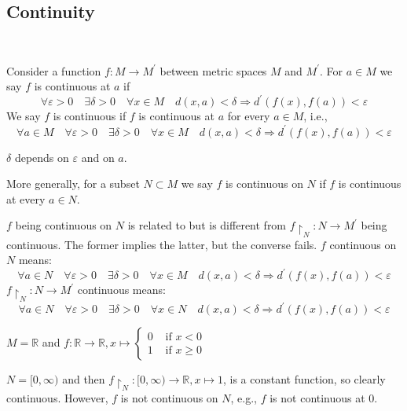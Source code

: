 \documentclass[a4paper,11pt]{article}
\begin{document}
\subsection{Continuity}\ \vspace{-1.5em}
\begin{definition}
    Consider a function $f: M \rightarrow M^{\prime}$ between metric spaces $M$ and $M^{\prime}$. For $a \in M$ we say $f$ is continuous at $a$ if
    \[
    \forall \varepsilon>0 \quad \exists \delta>0 \quad \forall x \in M \quad d(x, a)<\delta \Longrightarrow d^{\prime}(f(x), f(a))<\varepsilon
    \]
    We say $f$ is continuous if $f$ is continuous at $a$ for every $a \in M$, i.e.,
    \[
    \forall a \in M \quad \forall \varepsilon>0 \quad \exists \delta>0 \quad \forall x \in M \quad d(x, a)<\delta \Longrightarrow d^{\prime}(f(x), f(a))<\varepsilon
    \]
\end{definition}
\begin{note}
    $\delta$ depends on $\varepsilon$ and on $a$.
\end{note}
More generally, for a subset $N \subset M$ we say $f$ is continuous on $N$ if $f$ is continuous at every $a \in N$.
\begin{note}
    $f$ being continuous on $N$ is related to but is different from $f\restriction_N: N \rightarrow M^{\prime}$ being continuous. The former implies the latter, but the converse fails.
$f$ continuous on $N$ means:
    \[
        \forall a \in N \quad \forall \varepsilon>0 \quad \exists \delta>0 \quad \forall x \in M \quad d(x, a)<\delta \Longrightarrow d^{\prime}(f(x), f(a))<\varepsilon
    \]
    $f\restriction_N: N \rightarrow M^{\prime}$ continuous means:
    \[
        \forall a \in N \quad \forall \varepsilon>0 \quad \exists \delta>0 \quad \forall x \in N \quad d(x, a)<\delta \Longrightarrow d^{\prime}(f(x), f(a))<\varepsilon
    \]
\end{note}

\begin{example}
$M=\mathbb{R}$ and $f: \mathbb{R} \rightarrow \mathbb{R}, x \mapsto \begin{cases}0 & \text { if } x<0 \\ 1 & \text { if } x \geqslant 0\end{cases}$

$N=[0, \infty)$ and then $f\restriction_N:[0, \infty) \rightarrow \mathbb{R}, x \mapsto 1$, is a constant function, so clearly continuous. However, $f$ is not continuous on $N$, e.g., $f$ is not continuous at 0.
\end{example}
\end{document}

